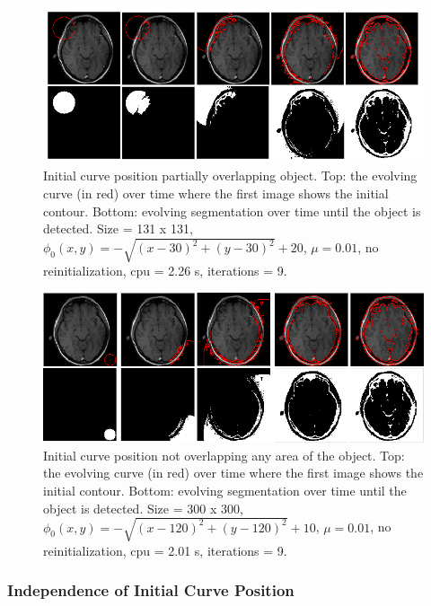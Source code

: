 \documentclass[10pt,twocolumn,letterpaper]{article}
\begin{document}
\begin{figure}[t!]
\centering
\includegraphics[width=12cm]{cv_eg3.png}
\caption{Initial curve position partially overlapping object. Top: the evolving curve (in red) over time where the first image shows the initial contour.
Bottom: evolving segmentation over time until the object is detected. Size = 131 x 131, $\phi_{0}(x,y) = - \sqrt{(x - 30)^2 + (y - 30)^2} + 20$, $\mu =
0.01$, no reinitialization, cpu = 2.26 s, iterations = 9.}
\label{fig:cv_eg3}
\end{figure}

\begin{figure}[t!]
\centering
\includegraphics[width=12cm]{cv_eg4.png}
\caption{Initial curve position not overlapping any area of the object. Top: the evolving curve (in red) over time where the first image shows the initial
contour. Bottom: evolving segmentation over time until the object is detected. Size = 300 x 300, $\phi_{0}(x,y) = - \sqrt{(x - 120)^2 + (y - 120)^2} + 10$,
$\mu =0.01$, no reinitialization, cpu = 2.01 s, iterations = 9.}
\label{fig:cv_eg4}
\end{figure}

\subsubsection*{Independence of Initial Curve Position}
\end{document}
